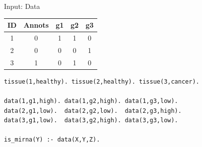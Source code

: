 \documentclass[10pt,dvipsnames]{beamer}
\begin{document}
\begin{frame}[fragile]{Input: Data}
\begin{center}
\begin{tabular}{|c|c|c|c|c|}
\hline
ID&	Annots&	g1&	g2&	g3\\
\hline
1&	0&	1&	1&	0\\
2&	0&	0&	0&	1\\
3&	1&	0&	1&	0\\
\hline
\end{tabular}
\end{center}
\vspace{0.2cm}
\begin{verbatim}
tissue(1,healthy). tissue(2,healthy). tissue(3,cancer).
 
data(1,g1,high). data(1,g2,high). data(1,g3,low).
data(2,g1,low).  data(2,g2,low).  data(2,g3,high).
data(3,g1,low).  data(3,g2,high). data(3,g3,low).
 
is_mirna(Y) :- data(X,Y,Z).
\end{verbatim}
\end{frame}
\end{document}
